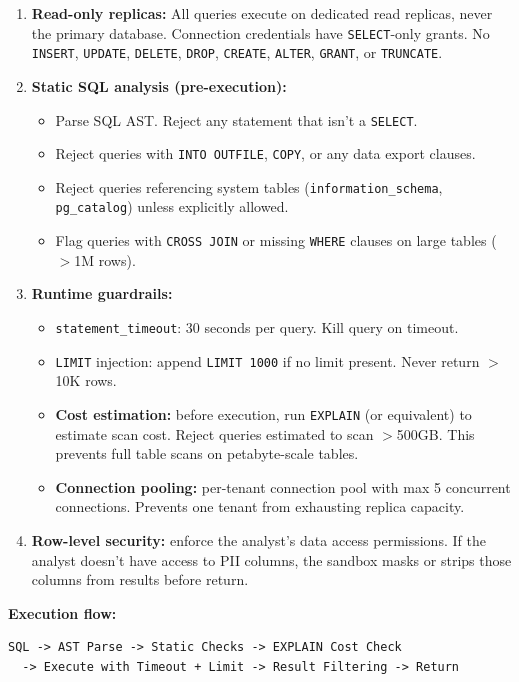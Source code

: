 \begin{enumerate}
  \item \textbf{Read-only replicas:} All queries execute on dedicated read replicas, never the primary database. Connection credentials have \texttt{SELECT}-only grants. No \texttt{INSERT}, \texttt{UPDATE}, \texttt{DELETE}, \texttt{DROP}, \texttt{CREATE}, \texttt{ALTER}, \texttt{GRANT}, or \texttt{TRUNCATE}.
  \item \textbf{Static SQL analysis (pre-execution):}
  \begin{itemize}
    \item Parse SQL AST. Reject any statement that isn't a \texttt{SELECT}.
    \item Reject queries with \texttt{INTO OUTFILE}, \texttt{COPY}, or any data export clauses.
    \item Reject queries referencing system tables (\texttt{information\_schema}, \texttt{pg\_catalog}) unless explicitly allowed.
    \item Flag queries with \texttt{CROSS JOIN} or missing \texttt{WHERE} clauses on large tables ($>$1M rows).
  \end{itemize}
  \item \textbf{Runtime guardrails:}
  \begin{itemize}
    \item \texttt{statement\_timeout}: 30 seconds per query. Kill query on timeout.
    \item \texttt{LIMIT} injection: append \texttt{LIMIT 1000} if no limit present. Never return $>$10K rows.
    \item \textbf{Cost estimation:} before execution, run \texttt{EXPLAIN} (or equivalent) to estimate scan cost. Reject queries estimated to scan $>$500GB. This prevents full table scans on petabyte-scale tables.
    \item \textbf{Connection pooling:} per-tenant connection pool with max 5 concurrent connections. Prevents one tenant from exhausting replica capacity.
  \end{itemize}
  \item \textbf{Row-level security:} enforce the analyst's data access permissions. If the analyst doesn't have access to PII columns, the sandbox masks or strips those columns from results before return.
\end{enumerate}

\textbf{Execution flow:}

\begin{verbatim}
SQL -> AST Parse -> Static Checks -> EXPLAIN Cost Check
  -> Execute with Timeout + Limit -> Result Filtering -> Return
\end{verbatim}

